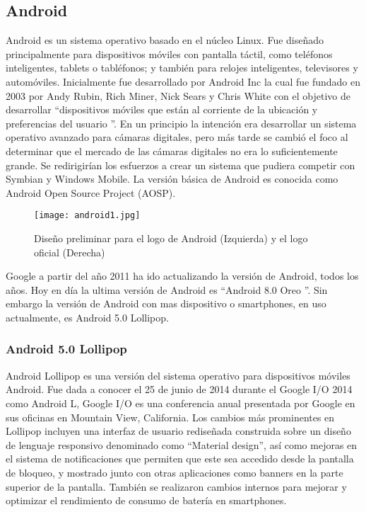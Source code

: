 \subsection{Android}

\par
Android es un sistema operativo basado en el núcleo Linux. Fue diseñado principalmente para dispositivos móviles con pantalla táctil, como teléfonos inteligentes, tablets o tabléfonos; y también para relojes inteligentes, televisores y automóviles. Inicialmente fue desarrollado por Android Inc la cual fue fundado en 2003 por Andy Rubin, Rich Miner, Nick Sears y Chris White con el objetivo de desarrollar \textquotedblleft dispositivos móviles que están al corriente de la ubicación y preferencias del usuario \textquotedblright\cite{android-wiki}. En un principio la intención era desarrollar un sistema operativo avanzado para cámaras digitales, pero más tarde se cambió el foco al determinar que el mercado de las cámaras digitales no era lo suficientemente grande. Se redirigirían los esfuerzos a crear un sistema que pudiera competir con Symbian y Windows Mobile\cite{android-xataka}. La versión básica de Android es conocida como Android Open Source Project (AOSP)\cite{android-wiki}.

\begin{figure}[H]
	\texttt{[image: android1.jpg]}
	\caption{Diseño preliminar para el logo de Android (Izquierda) y el logo oficial (Derecha)}
\end{figure}

\par \noindent
Google a partir del año 2011 ha ido actualizando la versión de Android, todos los años. Hoy en día la ultima versión de Android es \textquotedblleft Android 8.0 Oreo \textquotedblright. Sin embargo la versión de Android con mas dispositivo o smartphones, en uso actualmente, es Android 5.0 Lollipop. 

\subsubsection{Android 5.0 Lollipop} 

\par 
Android Lollipop es una versión del sistema operativo para dispositivos móviles Android. Fue dada a conocer el 25 de junio de 2014 durante el Google I/O 2014 como Android L, Google I/O es una conferencia anual presentada por Google en sus oficinas en Mountain View, California.
Los cambios más prominentes en Lollipop incluyen una interfaz de usuario rediseñada construida sobre un diseño de lenguaje responsivo denominado como \textquotedblleft Material design\textquotedblright, así como mejoras en el sistema de notificaciones que permiten que este sea accedido desde la pantalla de bloqueo, y mostrado junto con otras aplicaciones como banners en la parte superior de la pantalla. También se realizaron cambios internos para mejorar y optimizar el rendimiento de consumo de batería en smartphones\cite{lollipop}.

